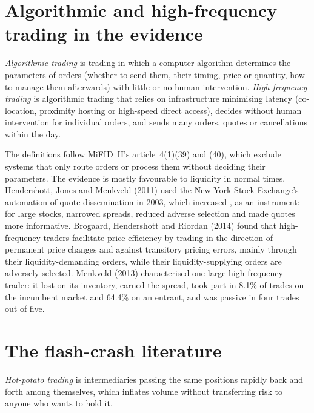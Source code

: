 \section{Algorithmic and high-frequency trading in the evidence}

\begin{definition}\label{def:mx:market-quality-and-regulation:hft}
\emph{Algorithmic trading} is trading in which a computer algorithm determines the parameters of orders (whether to send
them, their timing, price or quantity, how to manage them afterwards) with little or no human intervention. \emph{High-frequency
trading} is algorithmic trading that relies on infrastructure minimising latency (co-location, proximity hosting or
high-speed direct access), decides without human intervention for individual orders, and sends many orders, quotes or cancellations within the day.
\end{definition}

The definitions follow MiFID~II's article~4(1)(39) and (40), which exclude systems that only route orders or process them without deciding their
parameters. The evidence is mostly favourable to liquidity in normal times. Hendershott, Jones and Menkveld (2011) used the New York Stock Exchange's
automation of quote dissemination in 2003, which increased , as an instrument: for large stocks,  narrowed
spreads, reduced adverse selection and made quotes more informative. Brogaard, Hendershott and Riordan (2014) found that high-frequency traders
facilitate price efficiency by trading in the direction of permanent price changes and against transitory pricing errors, mainly through their
liquidity-demanding orders, while their liquidity-supplying orders are adversely selected. Menkveld (2013) characterised one large high-frequency
trader: it lost on its inventory, earned the spread, took part in 8.1\% of trades on the incumbent market and 64.4\% on an entrant, and was passive in
four trades out of five.

\section{The flash-crash literature}

\begin{definition}\label{def:mx:market-quality-and-regulation:hotpotato}
\emph{Hot-potato trading} is intermediaries passing the same positions rapidly back and forth among themselves, which
inflates volume without transferring risk to anyone who wants to hold it.
\end{definition}

